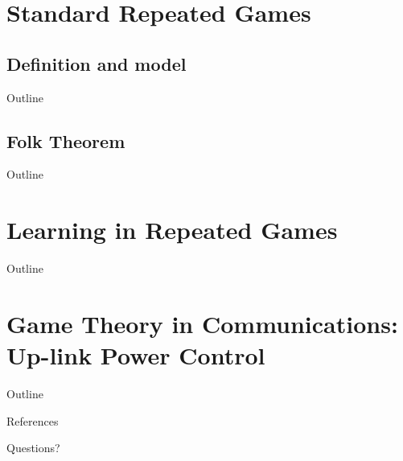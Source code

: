 \documentclass[10pt]{beamer}
\begin{document}


\section{Standard Repeated Games}
\subsection{Definition and model}
\begin{frame}{Outline}
\end{frame}



\subsection{Folk Theorem}
\begin{frame}{Outline}
\end{frame}



\section{Learning in Repeated Games}
\begin{frame}{Outline}
    \tableofcontents[currentsection]
\end{frame}



\section{Game Theory in Communications: Up-link Power Control}
\begin{frame}{Outline}
    \tableofcontents[currentsection]
\end{frame}



\begin{frame}{References}
    \nocite{*}
    
    
\end{frame}

\begin{frame}[standout]
    Questions?
\end{frame}
\end{document}
